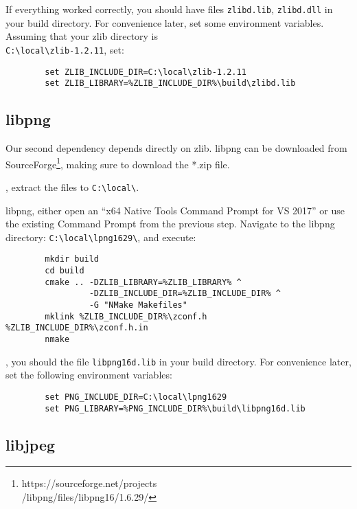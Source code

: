 \documentclass{tufte-handout}
\begin{document}
    If everything worked correctly, you should have files \Verb|zlibd.lib|, \Verb|zlibd.dll| in
    your build directory.  For convenience later, set some environment variables.  Assuming that
    your zlib directory is \\
    \Verb|C:\local\zlib-1.2.11|, set:

    \begin{lstlisting}
        set ZLIB_INCLUDE_DIR=C:\local\zlib-1.2.11
        set ZLIB_LIBRARY=%ZLIB_INCLUDE_DIR%\build\zlibd.lib
    \end{lstlisting}

\subsection{libpng}

    Our second dependency depends directly on zlib.  libpng can be downloaded from 
    SourceForge\footnote{https://sourceforge.net/projects \\
    /libpng/files/libpng16/1.6.29/}, making 
    sure to download the *.zip file.

    , extract the files to \Verb|C:\local\|.

     libpng, either open an ``x64 Native Tools Command Prompt for VS 2017''
    or use the existing Command Prompt from the previous step.  Navigate to the libpng directory:
    \Verb|C:\local\lpng1629\|, and execute:

    \begin{lstlisting}
        mkdir build
        cd build
        cmake .. -DZLIB_LIBRARY=%ZLIB_LIBRARY% ^ 
                 -DZLIB_INCLUDE_DIR=%ZLIB_INCLUDE_DIR% ^
                 -G "NMake Makefiles"
        mklink %ZLIB_INCLUDE_DIR%\zconf.h %ZLIB_INCLUDE_DIR%\zconf.h.in
        nmake
    \end{lstlisting}

    , you should the file \Verb|libpng16d.lib| in your build directory.
    For convenience later, set the following environment variables:

    \begin{lstlisting}
        set PNG_INCLUDE_DIR=C:\local\lpng1629
        set PNG_LIBRARY=%PNG_INCLUDE_DIR%\build\libpng16d.lib
    \end{lstlisting}

\subsection{libjpeg}
\end{document}
